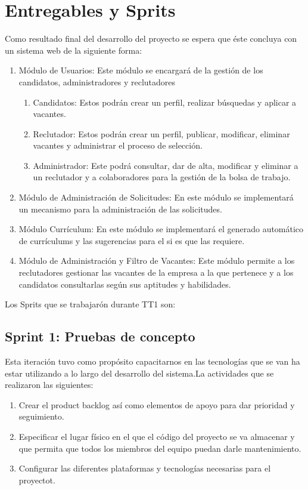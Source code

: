 \section{Entregables y Sprits}
Como resultado final del desarrollo del proyecto se espera que éste concluya con un sistema web de la siguiente forma:
\begin{enumerate}
    \item Módulo de Usuarios: Este módulo se encargará de la gestión de los candidatos, administradores y
    reclutadores
    \begin{enumerate}
        \item Candidatos: Estos podrán crear un perfil, realizar búsquedas y aplicar a vacantes.
        \item Reclutador: Estos podrán crear un perfil, publicar, modificar, eliminar vacantes y administrar el
proceso de selección.
        \item Administrador: Este podrá consultar, dar de alta, modificar y eliminar a un reclutador y a colaboradores para 
        la gestión de la bolsa de trabajo.

    \end{enumerate}
    \item Módulo de Administración de Solicitudes: En este módulo se implementará un mecanismo para la administración
de las solicitudes.
\item Módulo Currículum: En este módulo se implementará el generado automático de currículums y las
sugerencias para el si es que las requiere.
\item Módulo de Administración y Filtro de Vacantes: Este módulo permite a los reclutadores gestionar las
vacantes de la empresa a la que pertenece y a los candidatos consultarlas según sus aptitudes y habilidades.
\end{enumerate}
Los Sprits que se trabajarón durante TT1 son:
\subsection{Sprint 1: Pruebas de concepto}
Esta iteración tuvo como propósito capacitarnos en las tecnologías que se van ha estar utilizando 
a lo largo del desarrollo del sistema.La actividades que se realizaron las siguientes:

\begin{enumerate}
    \item Crear el product backlog así como elementos de apoyo para dar prioridad y seguimiento.
    \item Especificar el lugar físico en el que el código del proyecto se va almacenar y que permita que
    todos los miembros del equipo puedan darle mantenimiento.
    \item Configurar las diferentes plataformas y tecnologías necesarias para el proyectot.
\end{enumerate}

